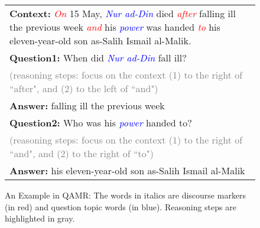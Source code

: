


\begin{figure}[t]
	{\fontsize{9}{10}\selectfont
    \setlength{\tabcolsep}{0.6mm}
    \begin{tabular}{|p{83mm}|}
    \hline
\textbf{Context: }\textit{\textcolor{red}{On}} 15 May, \textit{\textcolor{blue}{Nur ad-Din}} died \textit{\textcolor{red}{after}} falling ill the previous week \textit{\textcolor{red}{and}} his \textit{\textcolor{blue}{power}} was handed \textit{\textcolor{red}{to}} his eleven-year-old son as-Salih Ismail al-Malik. \\
\textbf{Question1: }When did \textit{\textcolor{blue}{Nur ad-Din}} fall ill?     \\
\textcolor{gray}{(reasoning steps: focus on the context (1) to the right of ``after", and (2) to the left of ``and")}\\
\textbf{Answer: }falling ill the previous week \\
\textbf{Question2: }Who was his \textit{\textcolor{blue}{power}} handed to?     \\
\textcolor{gray}{(reasoning steps: focus on the context (1) to the right of ``and", and (2) to the right of ``to")}\\
\textbf{Answer: }his eleven-year-old son as-Salih Ismail al-Malik \\
\hline
    \end{tabular}
    }
\caption{An Example in QAMR: The words in italics are discourse markers (in red) and question topic words (in blue). Reasoning steps are highlighted in gray. }
\label{fig:qa_example}
\vspace{-3ex}
\end{figure}
